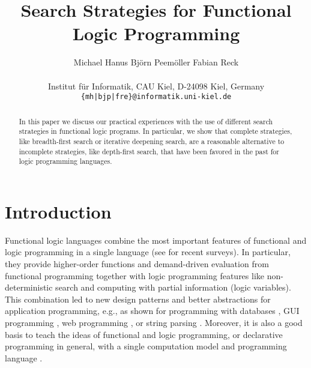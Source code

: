 \documentclass[english]{lni}
\author{
Michael Hanus
\quad
Bj{\"o}rn Peem{\"o}ller
\quad
Fabian Reck \\
\\
Institut f\"ur Informatik, CAU Kiel, D-24098 Kiel, Germany \\
\texttt{\{mh|bjp|fre\}@informatik.uni-kiel.de}
}
\title{Search Strategies for Functional Logic Programming}
\begin{document}
\maketitle

\begin{abstract}
In this paper we discuss our practical experiences
with the use of different search strategies
in functional logic programs.
In particular, we show that complete strategies,
like breadth-first search or iterative deepening search,
are a reasonable alternative to incomplete strategies, like depth-first
search, that have been favored in the past for logic programming languages.
\end{abstract}

\section{Introduction}

Functional logic languages combine the most important
features of functional and logic programming in a single language
(see \cite{AntoyHanus10CACM,Hanus07ICLP} for recent surveys).
In particular, they provide higher-order functions and demand-driven
evaluation from functional programming together with logic programming features
like non-deterministic search and computing with partial information
(logic variables).
This combination
led to new design patterns \cite{AntoyHanus02FLOPS,AntoyHanus11WFLP}
and better abstractions for application programming,
e.g., as shown for programming with databases
\cite{BrasselHanusMueller08PADL,Fischer05},
GUI programming \cite{Hanus00PADL},
web programming \cite{Hanus01PADL,Hanus06PPDP,HanusKoschnicke10PADL},
or string parsing \cite{CaballeroLopez99}.
Moreover, it is also a good basis
to teach the ideas of functional and logic programming,
or declarative programming in general,
with a single computation model and programming language
\cite{Hanus97DPLE}.
\end{document}
